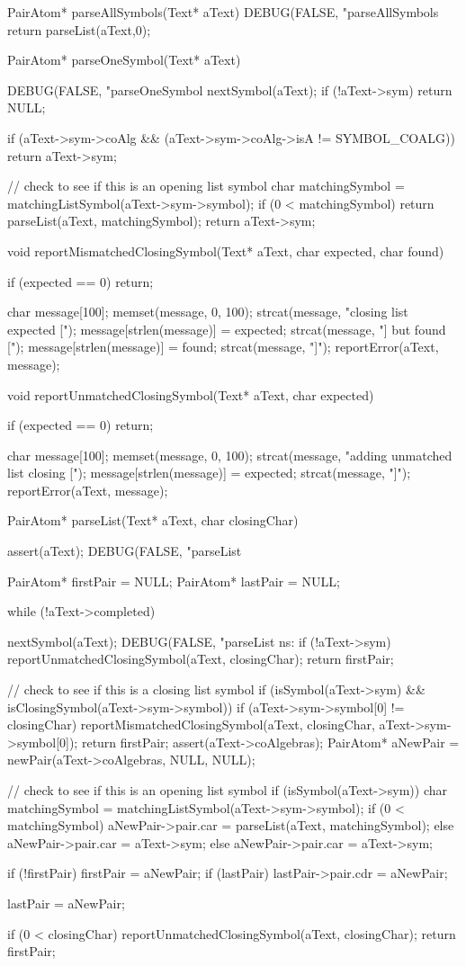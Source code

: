 PairAtom* parseAllSymbols(Text* aText) {
  DEBUG(FALSE, "parseAllSymbols %
  return parseList(aText,0);
}

PairAtom* parseOneSymbol(Text* aText) {
  DEBUG(FALSE, "parseOneSymbol %
  nextSymbol(aText);
  if (!aText->sym) return NULL;

  if (aText->sym->coAlg &&
     (aText->sym->coAlg->isA != SYMBOL_COALG)) return aText->sym;

  // check to see if this is an opening list symbol
  char matchingSymbol = matchingListSymbol(aText->sym->symbol);
  if (0 < matchingSymbol) {
    return parseList(aText, matchingSymbol);
  }
  return aText->sym;
}

void reportMismatchedClosingSymbol(Text* aText, char expected, char found) {
  if (expected == 0) return;

  char message[100];
  memset(message, 0, 100);
  strcat(message, "closing list expected [");
  message[strlen(message)] = expected;
  strcat(message, "] but found [");
  message[strlen(message)] = found;
  strcat(message, "]");
  reportError(aText, message);
}

void reportUnmatchedClosingSymbol(Text* aText, char expected) {
  if (expected == 0) return;

  char message[100];
  memset(message, 0, 100);
  strcat(message, "adding unmatched list closing [");
  message[strlen(message)] = expected;
  strcat(message, "]");
  reportError(aText, message);
}


PairAtom* parseList(Text* aText, char closingChar) {
  assert(aText);
  DEBUG(FALSE, "parseList %

  PairAtom* firstPair = NULL;
  PairAtom* lastPair  = NULL;

  while (!aText->completed) {

    nextSymbol(aText);
    DEBUG(FALSE, "parseList ns: %
    if (!aText->sym) {
      reportUnmatchedClosingSymbol(aText, closingChar);
      return firstPair;
    }

    // check to see if this is a closing list symbol
    if (isSymbol(aText->sym) &&
        isClosingSymbol(aText->sym->symbol)) {
      if (aText->sym->symbol[0] != closingChar) {
        reportMismatchedClosingSymbol(aText, closingChar,
                                      aText->sym->symbol[0]);
      }
      return firstPair;
    }
    assert(aText->coAlgebras);
    PairAtom* aNewPair = newPair(aText->coAlgebras, NULL, NULL);

    // check to see if this is an opening list symbol
    if (isSymbol(aText->sym)) {
      char matchingSymbol = matchingListSymbol(aText->sym->symbol);
      if (0 < matchingSymbol) {
        aNewPair->pair.car = parseList(aText, matchingSymbol);
      } else aNewPair->pair.car = aText->sym;
    } else aNewPair->pair.car = aText->sym;

    if (!firstPair) firstPair     = aNewPair;
    if (lastPair)   lastPair->pair.cdr = aNewPair;

    lastPair = aNewPair;
  }

  if (0 < closingChar) reportUnmatchedClosingSymbol(aText, closingChar);
  return firstPair;
}
\stoptyping

